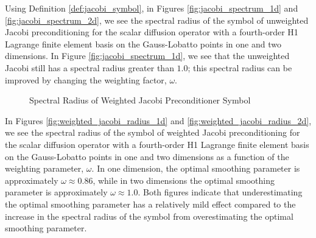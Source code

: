 Using Definition \ref{def:jacobi_symbol}, in Figures \ref{fig:jacobi_spectrum_1d} and \ref{fig:jacobi_spectrum_2d}, we see the spectral radius of the symbol of unweighted Jacobi preconditioning for the scalar diffusion operator with a fourth-order H1 Lagrange finite element basis on the Gauss-Lobatto points in one and two dimensions.
In Figure \ref{fig:jacobi_spectrum_1d}, we see that the unweighted Jacobi still has a spectral radius greater than $1.0$; this spectral radius can be improved by changing the weighting factor, $\omega$.

\begin{figure}[!ht]
  \centering
  \hfill
  \caption{Spectral Radius of Weighted Jacobi Preconditioner Symbol}
\end{figure}

In Figures \ref{fig:weighted_jacobi_radius_1d} and \ref{fig:weighted_jacobi_radius_2d}, we see the spectral radius of the symbol of weighted Jacobi preconditioning for the scalar diffusion operator with a fourth-order H1 Lagrange finite element basis on the Gauss-Lobatto points in one and two dimensions as a function of the weighting parameter, $\omega$.
In one dimension, the optimal smoothing parameter is approximately $\omega \approx 0.86$, while in two dimensions the optimal smoothing parameter is approximately $\omega \approx 1.0$.
Both figures indicate that underestimating the optimal smoothing parameter has a relatively mild effect compared to the increase in the spectral radius of the symbol from overestimating the optimal smoothing parameter.

